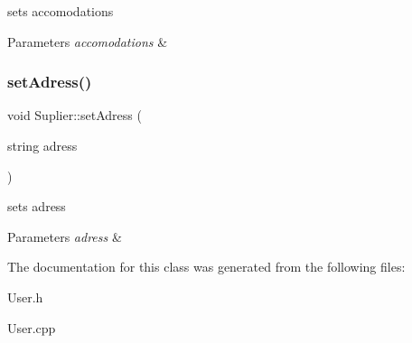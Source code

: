 sets accomodations 


\begin{DoxyParams}{Parameters}
{\em accomodations} & \\
\hline
\end{DoxyParams}
\hypertarget{class_suplier_a35d4dcc54e96c079ac8792806eeed739}{}\label{class_suplier_a35d4dcc54e96c079ac8792806eeed739} 
\subsubsection{\texorpdfstring{set\+Adress()}{setAdress()}}
{\footnotesize\ttfamily void Suplier\+::set\+Adress (\begin{DoxyParamCaption}\item[{string}]{adress }\end{DoxyParamCaption})\hspace{0.3cm}{\ttfamily [inline]}}



sets adress 


\begin{DoxyParams}{Parameters}
{\em adress} & \\
\hline
\end{DoxyParams}


The documentation for this class was generated from the following files\+:\begin{DoxyCompactItemize}
\item 
User.\+h\item 
User.\+cpp\end{DoxyCompactItemize}
